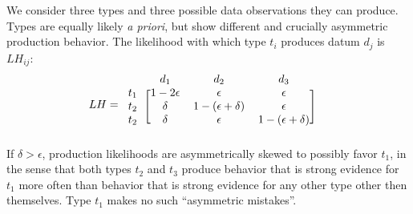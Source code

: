 \documentclass[a4paper, 11pt]{article}
\theoremstyle{Satz}
\begin{document}
We consider three types and three possible data observations they can produce. Types are
equally likely \emph{a priori}, but show different and crucially asymmetric production
behavior. The likelihood with which type $t_i$ produces datum $d_j$ is $LH_{ij}$:
\begin{align*}
  LH & = \begin{blockarray}{lccc}
    & d_1 & d_2 & d_3 \\
    \begin{block}{l[ccc]}
      t_1 & 1-2\epsilon & \epsilon & \epsilon \\
      t_2 & \delta & 1-(\epsilon + \delta) & \epsilon \\
      t_2 & \delta & \epsilon & 1-(\epsilon + \delta)  \\
    \end{block}
  \end{blockarray}
\end{align*}
If $\delta > \epsilon$, production likelihoods are asymmetrically skewed to possibly favor
$t_1$, in the sense that both types $t_2$ and $t_3$  produce behavior that is strong
evidence for $t_1$ more often than behavior that is strong evidence for any other
type other then themselves. Type $t_1$ makes no such ``asymmetric mistakes''. 
\end{document}
